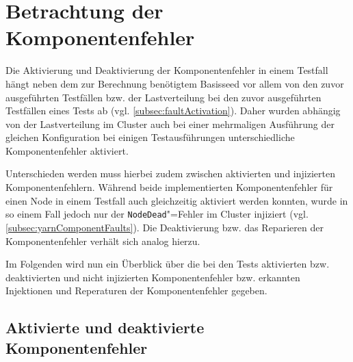 \section{Betrachtung der Komponentenfehler}
\label{sec:faultEval}

Die Aktivierung und Deaktivierung der Komponentenfehler in einem \gls{Testfall} hängt neben dem zur Berechnung benötigtem Basisseed vor allem von den zuvor ausgeführten Testfällen bzw. der Lastverteilung bei den zuvor ausgeführten Testfällen eines \glspl{Test} ab (vgl. \cref{subsec:faultActivation}).
Daher wurden abhängig von der Lastverteilung im Cluster auch bei einer mehrmaligen Ausführung der gleichen Konfiguration bei einigen Testausführungen unterschiedliche Komponentenfehler aktiviert.

Unterschieden werden muss hierbei zudem zwischen aktivierten und injizierten Komponentenfehlern.
Während beide implementierten Komponentenfehler für einen Node in einem \gls{Testfall} auch gleichzeitig aktiviert werden konnten, wurde in so einem Fall jedoch nur der \texttt{NodeDead}"=Fehler im Cluster injiziert (vgl. \cref{subsec:yarnComponentFaults}).
Die Deaktivierung bzw. das Reparieren der Komponentenfehler verhält sich analog hierzu.

Im Folgenden wird nun ein Überblick über die bei den \glspl{Test} aktivierten bzw. deaktivierten und nicht injizierten Komponentenfehler bzw. erkannten Injektionen und Reperaturen der Komponentenfehler gegeben.

\subsection{Aktivierte und deaktivierte Komponentenfehler}
\label{subsec:actDeactFaults}

